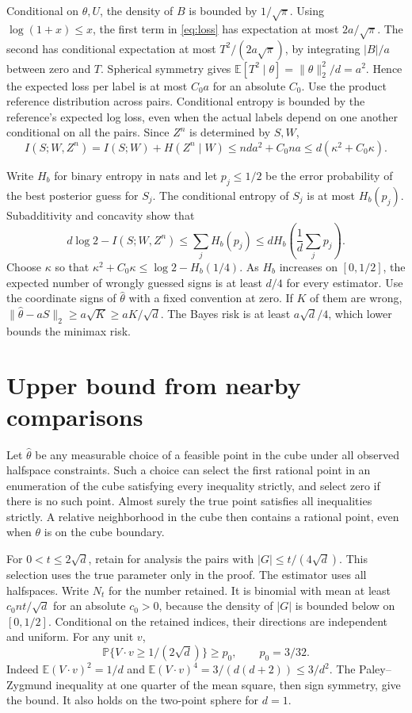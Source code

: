 \documentclass[11pt,a4paper]{amsart}
\begin{document}
Conditional on \(\theta,U\), the density of \(B\) is bounded by \(1/\sqrt\pi\). Using \(\log(1+x)\le x\), the first term in \eqref{eq:loss} has expectation at most \(2a/\sqrt\pi\). The second has conditional expectation at most \(T^2/(2a\sqrt\pi)\), by integrating \(|B|/a\) between zero and \(T\). Spherical symmetry gives \(\mathbb E[T^2\mid\theta]=\|\theta\|_2^2/d=a^2\). Hence the expected loss per label is at most \(C_0a\) for an absolute \(C_0\). Use the product reference distribution across pairs. Conditional entropy is bounded by the reference's expected log loss, even when the actual labels depend on one another conditional on all the pairs. Since \(Z^n\) is determined by \(S,W\),
\[
 I(S;W,Z^n)=I(S;W)+H(Z^n\mid W)
           \le nda^2+C_0 na\le d(\kappa^2+C_0\kappa).
\]

Write \(H_b\) for binary entropy in nats and let \(p_j\le1/2\) be the error probability of the best posterior guess for \(S_j\). The conditional entropy of \(S_j\) is at most \(H_b(p_j)\). Subadditivity and concavity show that
\[
 d\log 2-I(S;W,Z^n)\le \sum_jH_b(p_j)
                   \le dH_b\!\left(\frac1d\sum_jp_j\right).
\]
Choose \(\kappa\) so that \(\kappa^2+C_0\kappa\le\log 2-H_b(1/4)\). As \(H_b\) increases on \([0,1/2]\), the expected number of wrongly guessed signs is at least \(d/4\) for every estimator. Use the coordinate signs of \(\widehat\theta\) with a fixed convention at zero. If \(K\) of them are wrong, \(\|\widehat\theta-aS\|_2\ge a\sqrt K\ge aK/\sqrt d\). The Bayes risk is at least \(a\sqrt d/4\), which lower bounds the minimax risk.

\section{Upper bound from nearby comparisons}

Let \(\widehat\theta\) be any measurable choice of a feasible point in the cube under all observed halfspace constraints. Such a choice can select the first rational point in an enumeration of the cube satisfying every inequality strictly, and select zero if there is no such point. Almost surely the true point satisfies all inequalities strictly. A relative neighborhood in the cube then contains a rational point, even when \(\theta\) is on the cube boundary.

For \(0<t\le 2\sqrt d\), retain for analysis the pairs with \(|G|\le t/(4\sqrt d)\). This selection uses the true parameter only in the proof. The estimator uses all halfspaces. Write \(N_t\) for the number retained. It is binomial with mean at least \(c_0nt/\sqrt d\) for an absolute \(c_0>0\), because the density of \(|G|\) is bounded below on \([0,1/2]\). Conditional on the retained indices, their directions are independent and uniform. For any unit \(v\),
\[
 \mathbb P\{V\cdot v\ge 1/(2\sqrt d)\}\ge p_0,\qquad p_0=3/32.
\]
Indeed \(\mathbb E(V\cdot v)^2=1/d\) and \(\mathbb E(V\cdot v)^4=3/(d(d+2))\le3/d^2\). The Paley--Zygmund inequality at one quarter of the mean square, then sign symmetry, give the bound. It also holds on the two-point sphere for \(d=1\).
\end{document}
